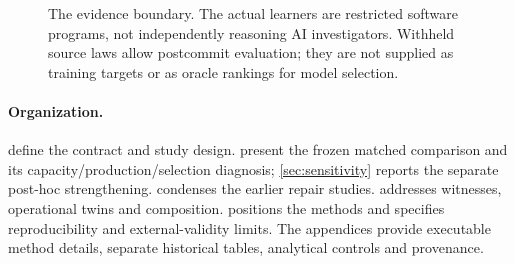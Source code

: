 \begin{figure}[tbp]
\centering
{}
\caption{The evidence boundary. The actual learners are restricted software programs, not independently reasoning AI investigators. Withheld source laws allow postcommit evaluation; they are not supplied as training targets or as oracle rankings for model selection.}
\label{fig:pipeline}
\end{figure}



\paragraph{Organization.}
 define the contract and study design.  present the frozen matched comparison and its capacity/production/selection diagnosis; \cref{sec:sensitivity} reports the separate post-hoc strengthening.  condenses the earlier repair studies.  addresses witnesses, operational twins and composition.  positions the methods and specifies reproducibility and external-validity limits. The appendices provide executable method details, separate historical tables, analytical controls and provenance.



